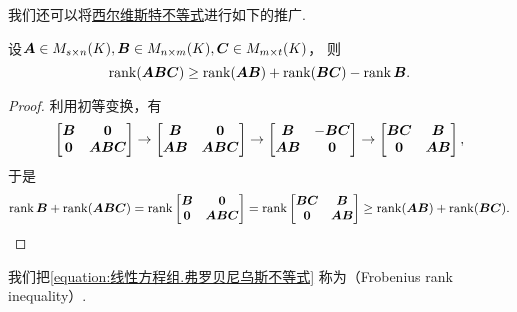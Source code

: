 我们还可以将\hyperref[equation:线性方程组.西尔维斯特不等式]{西尔维斯特不等式}进行如下的推广.
\begin{theorem}
设\(\boldsymbol{A} \in M_{s \times n}(K),
\boldsymbol{B} \in M_{n \times m}(K),
\boldsymbol{C} \in M_{m \times t}(K)\)，
则\begin{equation}\label{equation:线性方程组.弗罗贝尼乌斯不等式}
	\rank(\boldsymbol{A}\boldsymbol{B}\boldsymbol{C}) \geq \rank(\boldsymbol{A}\boldsymbol{B}) + \rank(\boldsymbol{B}\boldsymbol{C}) - \rank\boldsymbol{B}.
\end{equation}
\begin{proof}
利用初等变换，有\begin{equation*}
	\begin{bmatrix}
		\boldsymbol{B} & \boldsymbol0 \\
		\boldsymbol0 & \boldsymbol{A}\boldsymbol{B}\boldsymbol{C}
	\end{bmatrix}
	\to \begin{bmatrix}
		\boldsymbol{B} & \boldsymbol0 \\
		\boldsymbol{A}\boldsymbol{B} & \boldsymbol{A}\boldsymbol{B}\boldsymbol{C}
	\end{bmatrix}
	\to \begin{bmatrix}
		\boldsymbol{B} & -\boldsymbol{B}\boldsymbol{C} \\
		\boldsymbol{A}\boldsymbol{B} & \boldsymbol0
	\end{bmatrix}
	\to \begin{bmatrix}
		\boldsymbol{B}\boldsymbol{C} & \boldsymbol{B} \\
		\boldsymbol0 & \boldsymbol{A}\boldsymbol{B}
	\end{bmatrix},
\end{equation*}
于是\begin{equation*}
	\rank\boldsymbol{B} + \rank(\boldsymbol{A}\boldsymbol{B}\boldsymbol{C})
	= \rank\begin{bmatrix}
		\boldsymbol{B} & \boldsymbol0 \\
		\boldsymbol0 & \boldsymbol{A}\boldsymbol{B}\boldsymbol{C}
	\end{bmatrix}
	= \rank\begin{bmatrix}
		\boldsymbol{B}\boldsymbol{C} & \boldsymbol{B} \\
		\boldsymbol0 & \boldsymbol{A}\boldsymbol{B}
	\end{bmatrix}
	\geq \rank(\boldsymbol{A}\boldsymbol{B}) + \rank(\boldsymbol{B}\boldsymbol{C}).
	\qedhere
\end{equation*}
\end{proof}
\end{theorem}

我们把\cref{equation:线性方程组.弗罗贝尼乌斯不等式}
称为（Frobenius rank inequality）.

